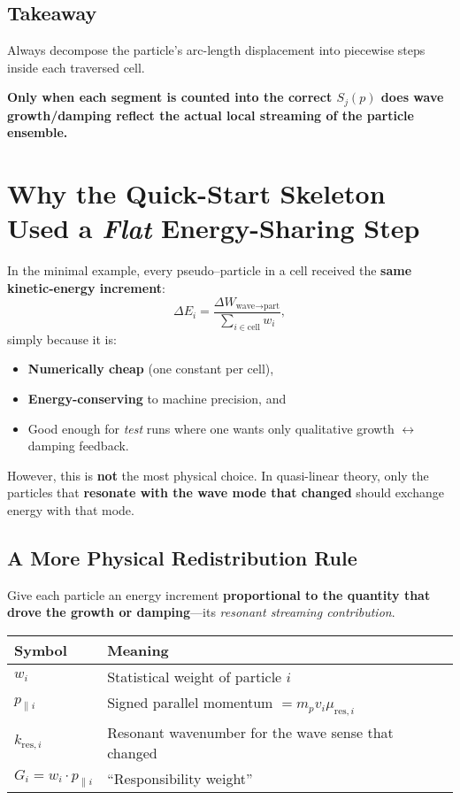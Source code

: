 \subsection*{Takeaway}

Always decompose the particle’s arc-length displacement into piecewise steps inside each traversed cell.

\textbf{Only when each segment is counted into the correct $S_j(p)$ does wave growth/damping reflect the actual local streaming of the particle ensemble.}


\section*{Why the Quick-Start Skeleton Used a \textit{Flat} Energy-Sharing Step}

In the minimal example, every pseudo–particle in a cell received the \textbf{same kinetic-energy increment}:
\[
\Delta E_i = \frac{\Delta W_{\text{wave}\to\text{part}}}
                  {\sum_{i \in \text{cell}} w_i},
\]
simply because it is:
\begin{itemize}
  \item \textbf{Numerically cheap} (one constant per cell),
  \item \textbf{Energy-conserving} to machine precision, and
  \item Good enough for \textit{test} runs where one wants only qualitative growth $\leftrightarrow$ damping feedback.
\end{itemize}

However, this is \textbf{not} the most physical choice. In quasi-linear theory, only the particles that \textbf{resonate with the wave mode that changed} should exchange energy with that mode.

\subsection*{A More Physical Redistribution Rule}

Give each particle an energy increment \textbf{proportional to the quantity that drove the growth or damping}—its \textit{resonant streaming contribution}.

\begin{tabular}{|l|p{10cm}|}
\hline
\textbf{Symbol} & \textbf{Meaning} \\
\hline
$w_i$ & Statistical weight of particle $i$ \\
$p_{\parallel i}$ & Signed parallel momentum $= m_p v_i \mu_{\text{res},i}$ \\
$k_{\text{res},i}$ & Resonant wavenumber for the wave sense that changed \\
$G_i = w_i \cdot p_{\parallel i}$ & “Responsibility weight” \\
\hline
\end{tabular}

